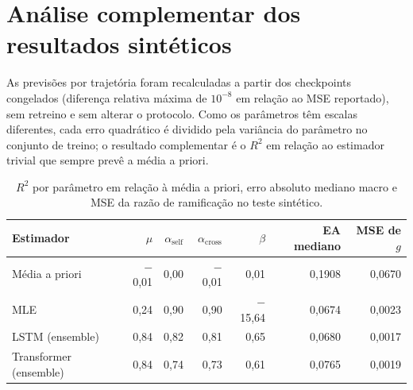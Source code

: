 \section{Análise complementar dos resultados sintéticos}
\label{sec:posthoc}

As previsões por trajetória foram recalculadas a partir dos checkpoints
congelados (diferença relativa máxima de $10^{-8}$ em relação ao MSE reportado),
sem retreino e sem alterar o protocolo. Como os parâmetros têm escalas
diferentes, cada erro quadrático é dividido pela variância do parâmetro no
conjunto de treino; o resultado complementar é o $R^2$ em relação ao
estimador trivial que sempre prevê a média a priori.

\begin{table}[htbp]
\centering
\caption{$R^2$ por parâmetro em relação à média a priori, erro absoluto
mediano macro e MSE da razão de ramificação no teste sintético.}
\label{tab:posthoc-r2}
\small
\begin{tabular}{lrrrrrr}
\toprule
Estimador & $\mu$ & $\alpha_{\mathrm{self}}$ & $\alpha_{\mathrm{cross}}$ & $\beta$ & EA mediano & MSE de $g$\\
\midrule
Média a priori & $-$0,01 & 0,00 & $-$0,01 & 0,01 & 0,1908 & 0,0670\\
MLE & 0,24 & 0,90 & 0,90 & $-$15,64 & 0,0674 & 0,0023\\
LSTM (ensemble) & 0,84 & 0,82 & 0,81 & 0,65 & 0,0680 & 0,0017\\
Transformer (ensemble) & 0,84 & 0,74 & 0,73 & 0,61 & 0,0765 & 0,0019\\
\bottomrule
\end{tabular}
\end{table}

